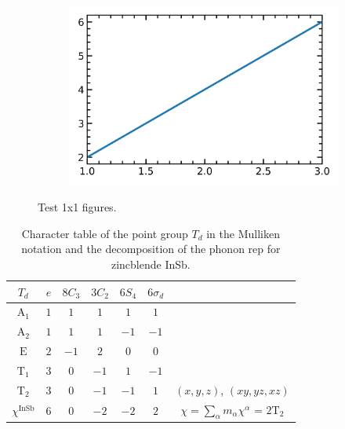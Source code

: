 \documentclass[12pt,a4paper,twoside]{article}
\numberwithin{equation}{section}
\renewcommand{\_}{\textscale{.7}{\textunderscore}}
\begin{document}
\begin{figure}[H]
	\centering
	\begin{subfigure}{0.65\linewidth}
		\includegraphics[width=1.0\linewidth]{1x1.png}
	\end{subfigure}
    \caption{Test 1x1 figures.}
\end{figure} 

\begin{table}[H]
  \begin{center}
   \caption{Character table of the point group $T_d$ in the Mulliken notation and the decomposition of the phonon rep for zincblende InSb.}\label{table:Td_character-main-text}
    \begin{tabular}{ | c | c  c  c  c  c | c  |}
      \hline
      $T_d$ & $e$ & $8C_3$ & $3C_2$ & $6S_4$ & $6\sigma_d$ &      \\ \hline

      $\textrm{A}_1$ & $1$ & $1$ & $1$ & $1$ & $1$ &  \\ 
      
      $\textrm{A}_2$ & $1$ & $1$ & $1$ & $-1$ & $-1$ & \\
      
      $\textrm{E}$ & $2$ & $-1$ & $2$ & $0$ & $0$ &  \\
      
      $\textrm{T}_1$ & $3$ & $0$ & $-1$ & $1$ & $-1$  &\\
      
      $\textrm{T}_2$ & $3$ & $0$ & $-1$ & $-1$ & $1$ & $(x,y,z)$, $(xy,yz,xz)$ \\ \hline
      
      $\chi^{\textrm{InSb}}$ & $6$ & $0$ & $-2$ & $-2$ & $2$ & $\chi = \sum_{\alpha} m_{\alpha} \chi^{\alpha}$ =   $2\textrm{T}_2$ \\ \hline
    \end{tabular}
  \end{center}
\end{table}
\end{document}
